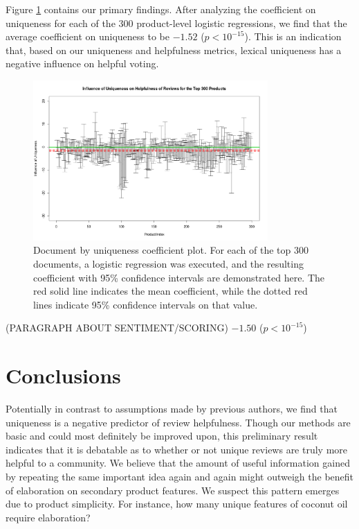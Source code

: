 \documentclass[10pt]{article}
\begin{document}
Figure \ref{fig:result} contains our primary findings. After analyzing the coefficient on uniqueness for each of the 300 product-level logistic regressions, we find that the average coefficient on uniqueness to be $-1.52$ ($p < 10^{-15}$). This is an indication that, based on our uniqueness and helpfulness metrics, lexical uniqueness has a negative influence on helpful voting. 

\begin{figure}[h!]
  \centering
  \includegraphics[width=0.8\textwidth]{influence.png}
  \caption{Document by uniqueness coefficient plot. For each of the top 300 documents, a logistic regression was executed, and the resulting coefficient with 95\% confidence intervals are demonstrated here. The red solid line indicates the mean coefficient, while the dotted red lines indicate 95\% confidence intervals on that value.}
  \label{fig:result}
\end{figure}

(PARAGRAPH ABOUT SENTIMENT/SCORING) $-1.50$ ($p < 10^{-15}$)

\section*{Conclusions}
Potentially in contrast to assumptions made by previous authors, we find that uniqueness is a negative predictor of review helpfulness. Though our methods are basic and could most definitely be improved upon, this preliminary result indicates that it is debatable as to whether or not unique reviews are truly more helpful to a community. We believe that the amount of useful information gained by repeating the same important idea again and again might outweigh the benefit of elaboration on secondary product features. We suspect this pattern emerges due to product simplicity. For instance, how many unique features of coconut oil require elaboration?
\end{document}
